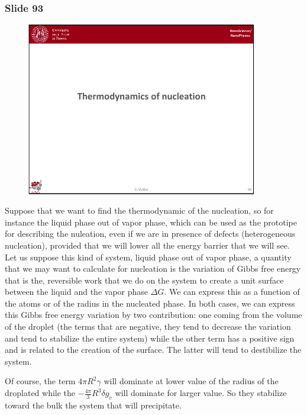 \documentclass[../main/main.tex]{subfiles}
\begin{document}
\newpage
\subsubsection{Slide 93}

\begin{figure}[h!]
\centering
\includegraphics[page=4,width=0.9\textwidth]{../lessons/pdf_file/6_lesson.pdf}
\end{figure}

Suppose that we want to find the thermodynamic of the nucleation, so for instance the liquid phase out of vapor phase, which can be used as the prototipe for describing the nuleation, even if we are in presence of defects (heterogeneous nucleation), provided that we will lower all the energy barrier that we will see. Let us suppose this kind of system, liquid phase out of vapor phase, a quantity that we may want to calculate for nucleation is the variation of Gibbs free energy that is the, reversible work that we do on the system to create a unit surface between the liquid and the vapor phase \( \Delta G \). We can express this as a function of the atoms or of the radius in the nucleated phase. In both cases, we can express this Gibbs free energy variation by two contribution: one coming from the volume of the droplet (the terms that are negative, they tend to decrease the variation and tend to stabilize the entire system) while the other term has a positive sign and is related to the creation of the surface. The latter will tend to destibilize the system.

Of course, the term \( 4 \pi R^2 \gamma   \) will dominate at lower value of the radius of the droplated while the \( - \frac{4 \pi }{3} R^3 \delta g_v \) will dominate for larger value. So they stabilize toward the bulk the system that will precipitate.
\end{document}
